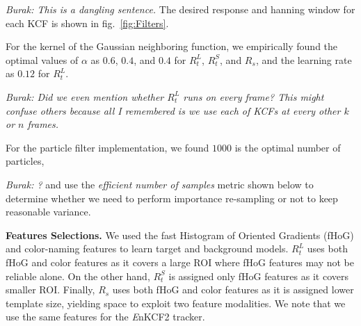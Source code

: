 \documentclass{bmvc2k}
\begin{document}
{\it Burak: This is a dangling sentence.} The desired response and
hanning window for each KCF is shown in fig.~\ref{fig:Filters}.


For the kernel of the Gaussian neighboring function, we empirically
found the optimal values of $\alpha$ as $0.6$, $0.4$, and $0.4$ for
$R_{t}^{L}$, $R_{t}^{S}$, and $R_{s}$, and the learning rate as $0.12$
for $R_{t}^{L}$. 

{\it Burak: Did we even mention whether $R_{t}^{L}$ runs on every
  frame? This might confuse others because all I remembered is we use
  each of KCFs at every other $k$ or $n$ frames.}


For the particle filter implementation, we found $1000$ is the optimal
number of particles, 


{\it Burak: ?}
and use the \textit{efficient number of samples}
metric shown below to determine whether we need to perform importance
re-sampling or not to keep reasonable variance.

\textbf{Features Selections.} We used the fast Histogram of Oriented
Gradients (fHoG)\cite{felzenszwalb2010object} and
color-naming\cite{van2009learning} features to learn target and
background models. $R_{t}^{L}$ uses both fHoG and color features as it
covers a large ROI where fHoG features may not be reliable alone. On
the other hand, $R_{t}^{S}$ is assigned only fHoG features as it
covers smaller ROI. Finally, $R_{s}$ uses both fHoG and color features
as it is assigned lower template size, yielding space to exploit two
feature modalities. We note that we use the same features for the {\it
  E}nKCF2 tracker.
\end{document}
